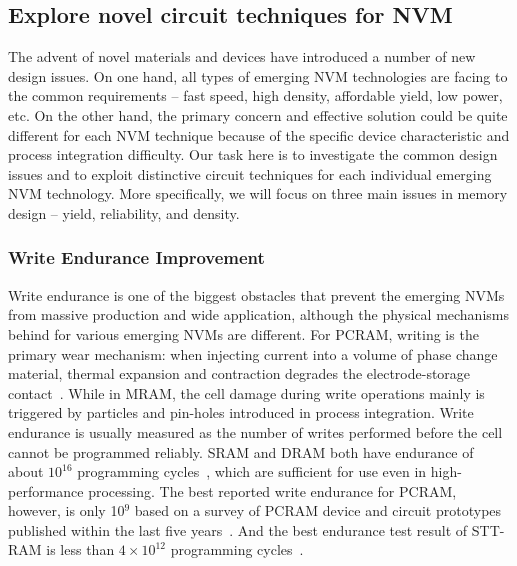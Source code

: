 
\subsection{Explore novel circuit techniques for NVM}

The advent of novel materials and devices have introduced a number of new design issues. On one hand, all types of emerging NVM technologies are facing to the common requirements -- fast speed, high density, affordable yield, low power, etc. On the other hand, the primary concern and effective solution could be quite different for each NVM technique because of the specific device characteristic and process integration difficulty. Our task here is to investigate the common design issues and to exploit distinctive circuit techniques for each individual emerging NVM technology. More specifically, we will focus on three main issues in memory design -- yield, reliability, and density.

\subsubsection{Write Endurance Improvement}

Write endurance is one of the biggest obstacles that prevent the emerging NVMs from massive production and wide application, although the physical mechanisms behind for various emerging NVMs are different. For PCRAM, writing is the primary wear mechanism: when injecting current into a volume of phase change material, thermal expansion and contraction degrades the electrode-storage contact~\cite{Lee09}. While in MRAM, the cell damage during write operations mainly is triggered by particles and pin-holes introduced in process integration.  Write endurance is usually measured as the number of writes performed before the cell cannot be programmed reliably. SRAM and DRAM both have endurance of about $10^{16}$ programming cycles~\cite{ITRS07}, which are sufficient for use even in high-performance processing. The best reported write endurance for PCRAM, however, is only 10$^9$ based on a survey of PCRAM device and circuit prototypes published within the last five years~\cite{Lee09}. And the best endurance test result of STT-RAM is less than $4\times10^{12}$ programming cycles~\cite{Diao07}.

